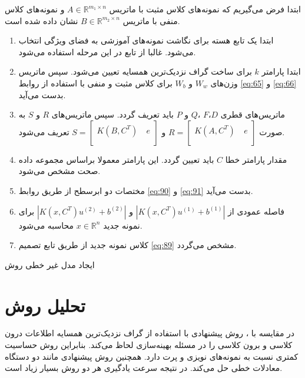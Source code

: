 \begin{algorithm}[!t]
\begin{steps}
	
	ابتدا فرض می‌گیریم که نمونه‌های کلاس مثبت با ماتریس  $A\in {{\mathbb{R}}^{{{m}_{1}}\times n}}$ و نمونه‌های کلاس منفی با ماتریس  $B\in {{\mathbb{R}}^{{{m}_{2}}\times n}}$ نشان داده شده است.
	
	\begin{enumerate}
		\item ابتدا یک تابع هسته برای نگاشت نمونه‌های آموزشی به فضای ویژگی انتخاب می‌شود. غالبا از تابع  در این مرحله استفاده می‌شود.
		\item ابتدا پارامتر  $k$ برای ساخت گراف نزدیک‌ترین همسایه تعیین می‌شود. سپس ماتریس وزن‌های  $W_{w}$ و   $W_{b}$ برای کلاس مثبت و منفی با استفاده از روابط \ref{eq:65} و \ref{eq:66} بدست می‌آید.
		\item ماتریس‌های قطری  $D$،$F$ ،$Q$  و $P$ باید تعریف گردد. سپس ماتریس‌های $R$ و  $S$ به صورت  $R=\left[ \begin{matrix} K(A,{{C}^{T}})\ & e  \\ \end{matrix} \right]$  و $S=\left[ \begin{matrix} K(B,{{C}^{T}})\ & e  \\ \end{matrix} \right]$  تعریف می‌شود.
		\item مقدار پارامتر خطا $C$ باید تعیین گردد. این پارامتر معمولا براساس مجموعه داده صحت  مشخص می‌شود.
		\item مختصات دو ابرسطح از طریق روابط \ref{eq:90} و \ref{eq:91} بدست می‌آید.
		\item فاصله عمودی از $|K(x,{C}^{T}){{u}^{(1)}}+{{b}^{(1)}}|$ و  $|K(x,{C}^{T}){{u}^{(2)}}+{{b}^{(2)}}|$ برای نمونه جدید  $x \in \mathbb{R}^{n}$ محاسبه می‌شود.
		\item کلاس نمونه جدید از طریق تابع تصمیم \ref{eq:89} مشخص می‌گردد.
	\end{enumerate}
\caption{ ایجاد مدل غیر خطی روش }
\label{Algo:Non-Linear-KNN-LSTSVM}
\end{steps}
\end{algorithm}

\section{تحلیل روش }\label{sec:3:4}
در مقایسه با ، روش پیشنهادی با استفاده از گراف نزدیک‌ترین همسایه اطلاعات درون کلاسی و برون کلاسی را در مسئله بهینه‌سازی لحاظ می‌کند. بنابراین روش  حساسیت کمتری نسبت به نمونه‌های نویزی و پرت دارد. همچنین روش پیشنهادی مانند  دو دستگاه معادلات خطی حل می‌کند. در نتیجه سرعت یادگیری هر دو روش بسیار زیاد است.


